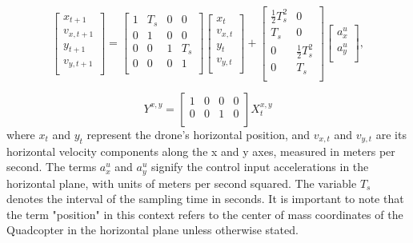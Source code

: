 \documentclass{article}
\begin{document}
\begin{equation}
\begin{bmatrix}
    x_{t+1} \\
    v_{x,t+1} \\
    y_{t+1} \\
    v_{y,t+1} \\
\end{bmatrix} =
\begin{bmatrix}
    1 & T_s & 0 & 0 \\
    0 & 1 & 0 & 0 \\
    0 & 0 & 1 & T_s \\
    0 & 0 & 0 & 1 \\
\end{bmatrix}
\begin{bmatrix}
    x_t \\
    v_{x,t} \\
    y_t \\
    v_{y,t} \\
\end{bmatrix} +
\begin{bmatrix}
    \frac{1}{2}T_s^2 & 0 \\
    T_s & 0 \\
    0 & \frac{1}{2}T_s^2 \\
    0 & T_s \\
\end{bmatrix}
\begin{bmatrix}
    a_{x}^u \\
    a_{y}^u \\
\end{bmatrix},
\end{equation}

\begin{equation}
    Y^{x,y} = 
\begin{bmatrix}
    1 & 0 & 0 & 0 \\
    0 & 0 & 1 & 0 \\
\end{bmatrix}
X_t^{x,y}
\end{equation}
where \( x_t \) and \( y_t \) represent the drone's horizontal position,
 and \( v_{x,t} \) and \( v_{y,t} \) are its horizontal velocity 
 components along the x and y axes, measured in meters per second. 
 The terms \( a_{x}^u \) and \( a_{y}^u \) signify the control input 
 accelerations in the horizontal plane, with units of meters per second 
 squared. The variable \( T_s \) denotes the interval of the sampling 
 time in seconds. It is important to note that the term "position" in 
 this context refers to the center of mass coordinates of the Quadcopter in the 
 horizontal plane unless otherwise stated.
\end{document}
